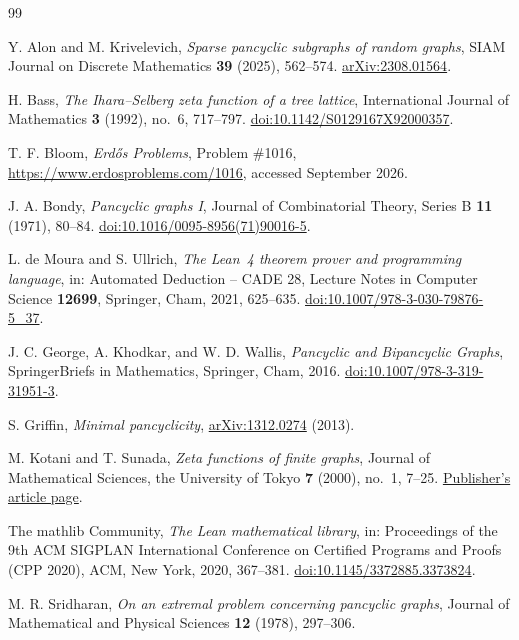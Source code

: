 \documentclass[11pt,a4paper]{article}
\numberwithin{equation}{section}
\theoremstyle{definition}
\theoremstyle{remark}
\begin{document}
\begin{thebibliography}{99}
\small
\setlength{\itemsep}{2pt}
\setlength{\parskip}{0pt}

Y. Alon and M. Krivelevich,
\emph{Sparse pancyclic subgraphs of random graphs},
SIAM Journal on Discrete Mathematics \textbf{39} (2025), 562--574.
\href{https://arxiv.org/abs/2308.01564}{arXiv:2308.01564}.

H. Bass,
\emph{The Ihara--Selberg zeta function of a tree lattice},
International Journal of Mathematics \textbf{3} (1992), no.~6, 717--797.
\href{https://doi.org/10.1142/S0129167X92000357}{doi:10.1142/S0129167X92000357}.

T. F. Bloom,
\emph{Erd\H{o}s Problems}, Problem \#1016,
\url{https://www.erdosproblems.com/1016}, accessed September 2026.

J. A. Bondy,
\emph{Pancyclic graphs I},
Journal of Combinatorial Theory, Series B \textbf{11} (1971), 80--84.
\href{https://doi.org/10.1016/0095-8956(71)90016-5}{doi:10.1016/0095-8956(71)90016-5}.

L. de Moura and S. Ullrich,
\emph{The Lean~4 theorem prover and programming language},
in: Automated Deduction -- CADE 28, Lecture Notes in Computer Science \textbf{12699}, Springer, Cham, 2021, 625--635.
\href{https://doi.org/10.1007/978-3-030-79876-5_37}{doi:10.1007/978-3-030-79876-5\_37}.

J. C. George, A. Khodkar, and W. D. Wallis,
\emph{Pancyclic and Bipancyclic Graphs},
SpringerBriefs in Mathematics, Springer, Cham, 2016.
\href{https://doi.org/10.1007/978-3-319-31951-3}{doi:10.1007/978-3-319-31951-3}.

S. Griffin,
\emph{Minimal pancyclicity},
\href{https://arxiv.org/abs/1312.0274}{arXiv:1312.0274} (2013).

M. Kotani and T. Sunada,
\emph{Zeta functions of finite graphs},
Journal of Mathematical Sciences, the University of Tokyo \textbf{7} (2000), no.~1, 7--25.
\href{https://www.ms.u-tokyo.ac.jp/journal/abstract/jms070102.html}{Publisher's article page}.

The mathlib Community,
\emph{The Lean mathematical library},
in: Proceedings of the 9th ACM SIGPLAN International Conference on Certified Programs and Proofs (CPP 2020), ACM, New York, 2020, 367--381.
\href{https://doi.org/10.1145/3372885.3373824}{doi:10.1145/3372885.3373824}.

M. R. Sridharan,
\emph{On an extremal problem concerning pancyclic graphs},
Journal of Mathematical and Physical Sciences \textbf{12} (1978), 297--306.

\end{thebibliography}
\end{document}
